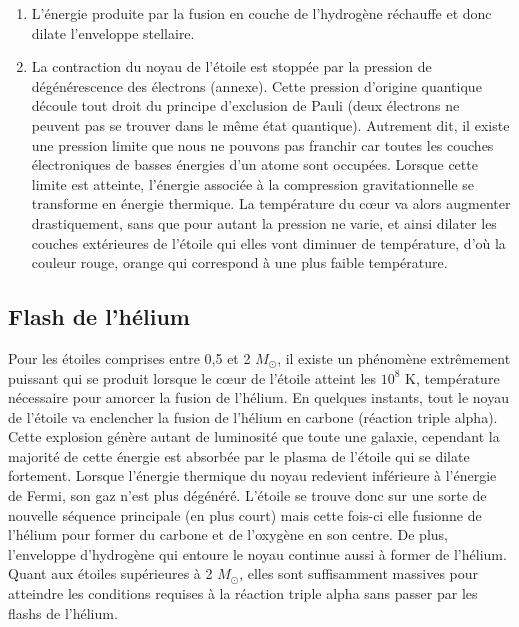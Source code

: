 \begin{enumerate}
	\item L’énergie produite par la fusion en couche de l’hydrogène réchauffe et donc dilate l’enveloppe stellaire.
	\item La contraction du noyau de l’étoile est stoppée par la pression de dégénérescence des électrons (annexe). Cette pression d’origine quantique découle tout droit du principe d’exclusion de Pauli (deux électrons ne peuvent pas se trouver dans le même état quantique). Autrement dit, il existe une pression limite que nous ne pouvons pas franchir car toutes les couches électroniques de basses énergies d’un atome sont occupées. Lorsque cette limite est atteinte, l’énergie associée à la compression gravitationnelle se transforme en énergie thermique. La température du cœur va alors augmenter drastiquement, sans que pour autant la pression ne varie, et ainsi dilater les couches extérieures de l’étoile qui elles vont diminuer de température, d’où la couleur rouge, orange qui correspond à une plus faible température. 
	
\end{enumerate}

\subsection{Flash de l'hélium}

Pour les étoiles comprises entre 0,5 et 2 $M_\odot$, il existe un phénomène extrêmement puissant qui se produit lorsque le cœur de l’étoile atteint les $10^{8}$ K, température nécessaire pour amorcer la fusion de l’hélium. En quelques instants, tout le noyau de l’étoile va enclencher la fusion de l’hélium en carbone (réaction triple alpha). Cette explosion génère autant de luminosité que toute une galaxie, cependant la majorité de cette énergie est absorbée par le plasma de l’étoile qui se dilate fortement. Lorsque l’énergie thermique du noyau redevient inférieure à l’énergie de Fermi, son gaz n’est plus dégénéré. L’étoile se trouve donc sur une sorte de nouvelle séquence principale (en plus court) mais cette fois-ci elle fusionne de l’hélium pour former du carbone et de l’oxygène en son centre. De plus, l’enveloppe d’hydrogène qui entoure le noyau continue aussi à former de l’hélium.\newline \\ Quant aux étoiles supérieures à 2 $M_\odot$, elles sont suffisamment massives pour atteindre les conditions requises à la réaction triple alpha sans passer par les flashs de l’hélium.\newpage

